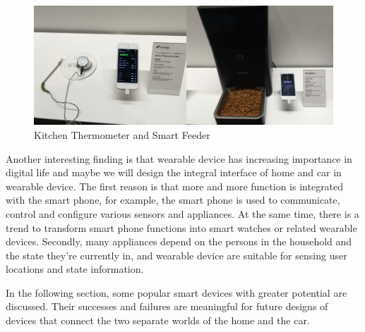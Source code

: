 
\begin{figure}[ht]
	\centering
    \includegraphics[width=\textwidth]{Figures/BenchmarkingOld/Thermometer_and_Feeder.jpg}
	\caption{Kitchen Thermometer and Smart Feeder}
    \label{fig:Thermostat_and_Feeder}
\end{figure}

Another interesting finding is that wearable device has increasing importance in digital life and maybe we will design the integral interface of home and car in wearable device. The first reason is that more and more function is integrated with the smart phone, for example, the smart phone is used to communicate, control and configure various sensors and appliances. At the same time, there is a trend to transform smart phone functions into smart watches or related wearable devices. Secondly, many appliances depend on the persons in the household and the state they're currently in, and wearable device are suitable for sensing user locations and state information.

In the following section, some popular smart devices with greater potential are discussed. Their successes and failures are meaningful for future designs of devices that connect the two separate worlds of the home and the car.

